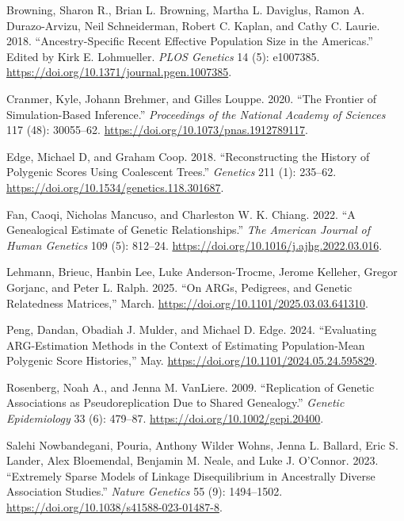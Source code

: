 \documentclass[
  letterpaper,
  DIV=11,
  numbers=noendperiod]{scrartcl}
\newlength{\cslhangindent}
\newenvironment{CSLReferences}[2] %
 {\begin{list}{}{%
  \setlength{\itemindent}{0pt}
  \setlength{\leftmargin}{0pt}
  \setlength{\parsep}{0pt}
  \ifodd #1
   \setlength{\leftmargin}{\cslhangindent}
   \setlength{\itemindent}{-1\cslhangindent}
  \fi
  \setlength{\itemsep}{#2\baselineskip}}}
 {\end{list}}
\begin{document}
\label{refs}
\begin{CSLReferences}{1}{0}
Browning, Sharon R., Brian L. Browning, Martha L. Daviglus, Ramon A.
Durazo-Arvizu, Neil Schneiderman, Robert C. Kaplan, and Cathy C. Laurie.
2018. {``Ancestry-Specific Recent Effective Population Size in the
Americas.''} Edited by Kirk E. Lohmueller. \emph{PLOS Genetics} 14 (5):
e1007385. \url{https://doi.org/10.1371/journal.pgen.1007385}.

Cranmer, Kyle, Johann Brehmer, and Gilles Louppe. 2020. {``The Frontier
of Simulation-Based Inference.''} \emph{Proceedings of the National
Academy of Sciences} 117 (48): 30055--62.
\url{https://doi.org/10.1073/pnas.1912789117}.

Edge, Michael D, and Graham Coop. 2018. {``Reconstructing the History of
Polygenic Scores Using Coalescent Trees.''} \emph{Genetics} 211 (1):
235--62. \url{https://doi.org/10.1534/genetics.118.301687}.

Fan, Caoqi, Nicholas Mancuso, and Charleston W. K. Chiang. 2022. {``A
Genealogical Estimate of Genetic Relationships.''} \emph{The American
Journal of Human Genetics} 109 (5): 812--24.
\url{https://doi.org/10.1016/j.ajhg.2022.03.016}.

Lehmann, Brieuc, Hanbin Lee, Luke Anderson-Trocme, Jerome Kelleher,
Gregor Gorjanc, and Peter L. Ralph. 2025. {``On ARGs, Pedigrees, and
Genetic Relatedness Matrices,''} March.
\url{https://doi.org/10.1101/2025.03.03.641310}.

Peng, Dandan, Obadiah J. Mulder, and Michael D. Edge. 2024.
{``Evaluating ARG-Estimation Methods in the Context of Estimating
Population-Mean Polygenic Score Histories,''} May.
\url{https://doi.org/10.1101/2024.05.24.595829}.

Rosenberg, Noah A., and Jenna M. VanLiere. 2009. {``Replication of
Genetic Associations as Pseudoreplication Due to Shared Genealogy.''}
\emph{Genetic Epidemiology} 33 (6): 479--87.
\url{https://doi.org/10.1002/gepi.20400}.

Salehi Nowbandegani, Pouria, Anthony Wilder Wohns, Jenna L. Ballard,
Eric S. Lander, Alex Bloemendal, Benjamin M. Neale, and Luke J.
O'Connor. 2023. {``Extremely Sparse Models of Linkage Disequilibrium in
Ancestrally Diverse Association Studies.''} \emph{Nature Genetics} 55
(9): 1494--1502. \url{https://doi.org/10.1038/s41588-023-01487-8}.


\end{CSLReferences}
\end{document}
